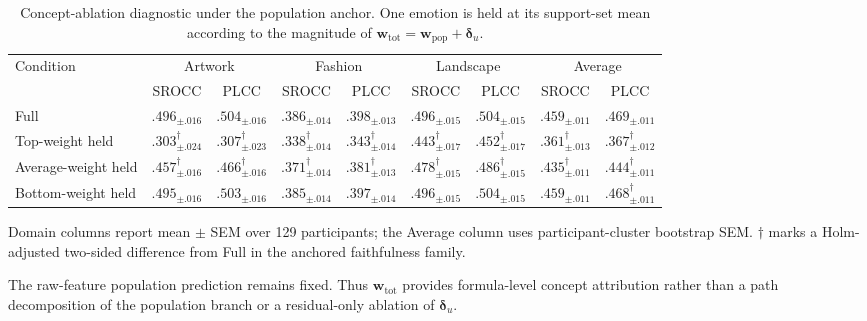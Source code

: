 \documentclass[10pt,twocolumn,letterpaper]{article}
\begin{document}
\begin{table}[!tbp]
\centering
\begin{threeparttable}
\caption{Concept-ablation diagnostic under the population anchor. One emotion
is held at its support-set mean according to the magnitude of
$\mathbf w_{\mathrm{tot}}=\mathbf w_{\mathrm{pop}}+\boldsymbol\delta_u$.}
\label{tab:concept_ablation}
\footnotesize
\setlength{\tabcolsep}{1.6pt}
    \begin{tabular}{l cc cc cc cc}
    \toprule
    \multirow{2}{*}{Condition} & \multicolumn{2}{c}{Artwork} & \multicolumn{2}{c}{Fashion} & \multicolumn{2}{c}{Landscape} & \multicolumn{2}{c}{Average} \\
    \cmidrule(lr){2-3}\cmidrule(lr){4-5}\cmidrule(lr){6-7}\cmidrule(lr){8-9}
    & SROCC & PLCC & SROCC & PLCC & SROCC & PLCC & SROCC & PLCC \\
    \midrule
    Full & $\bm{.496_{\pm .016}}$ & $\bm{.504_{\pm .016}}$ & $\bm{.386_{\pm .014}}$ & $\bm{.398_{\pm .013}}$ & $\bm{.496_{\pm .015}}$ & $\bm{.504_{\pm .015}}$ & $\bm{.459_{\pm .011}}$ & $\bm{.469_{\pm .011}}$ \\
    Top-weight held & $.303_{\pm .024}^{\dagger}$ & $.307_{\pm .023}^{\dagger}$ & $.338_{\pm .014}^{\dagger}$ & $.343_{\pm .014}^{\dagger}$ & $.443_{\pm .017}^{\dagger}$ & $.452_{\pm .017}^{\dagger}$ & $.361_{\pm .013}^{\dagger}$ & $.367_{\pm .012}^{\dagger}$ \\
    Average-weight held & $.457_{\pm .016}^{\dagger}$ & $.466_{\pm .016}^{\dagger}$ & $.371_{\pm .014}^{\dagger}$ & $.381_{\pm .013}^{\dagger}$ & $.478_{\pm .015}^{\dagger}$ & $.486_{\pm .015}^{\dagger}$ & $.435_{\pm .011}^{\dagger}$ & $.444_{\pm .011}^{\dagger}$ \\
    Bottom-weight held & $.495_{\pm .016}$ & $.503_{\pm .016}$ & $.385_{\pm .014}$ & $.397_{\pm .014}$ & $.496_{\pm .015}$ & $.504_{\pm .015}$ & $.459_{\pm .011}$ & $.468_{\pm .011}^{\dagger}$ \\
    \bottomrule
    \end{tabular}
\begin{tablenotes}[flushleft]\footnotesize
    \item Domain columns report mean $\pm$ SEM over 129 participants; the Average
    column uses participant-cluster bootstrap SEM. $\dagger$ marks a
    Holm-adjusted two-sided difference from Full in the anchored faithfulness
    family.
    \item The raw-feature population prediction remains fixed. Thus
    $\mathbf w_{\mathrm{tot}}$ provides formula-level concept attribution rather
    than a path decomposition of the population branch or a residual-only ablation
    of $\boldsymbol\delta_u$.
\end{tablenotes}
\end{threeparttable}
\end{table}
\end{document}
